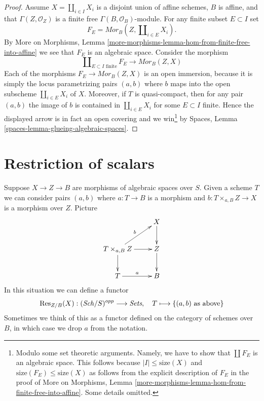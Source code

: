 \begin{proof}
\medskip\noindent
Assume $X = \coprod_{i \in I} X_i$ is a disjoint union of affine
schemes, $B$ is affine, and that $\Gamma(Z, \mathcal{O}_Z)$ is a finite
free $\Gamma(B, \mathcal{O}_B)$-module. For any finite subset
$E \subset I$ set
$$
F_E = \mathit{Mor}_B(Z, \coprod\nolimits_{i \in E} X_i).
$$
By More on Morphisms,
Lemma \ref{more-morphisms-lemma-hom-from-finite-free-into-affine}
we see that $F_E$ is an algebraic space. Consider the morphism
$$
\coprod\nolimits_{E \subset I\text{ finite}} F_E
\longrightarrow
\mathit{Mor}_B(Z, X)
$$
Each of the morphisms
$F_E \to \mathit{Mor}_B(Z, X)$ is an open immersion, because it is
simply the locus parametrizing pairs $(a, b)$ where $b$ maps into
the open subscheme $\coprod\nolimits_{i \in E} X_i$ of $X$. Moreover,
if $T$ is quasi-compact, then for any pair $(a, b)$ the image
of $b$ is contained in $\coprod\nolimits_{i \in E} X_i$ for some
$E \subset I$ finite. Hence the displayed arrow is in fact an
open covering and we win\footnote{Modulo
some set theoretic arguments. Namely, we have to show that
$\coprod F_E$ is an algebraic space. This follows because
$|I| \leq \text{size}(X)$ and $\text{size}(F_E) \leq \text{size}(X)$
as follows from the explicit description of $F_E$ in the proof of
More on Morphisms,
Lemma \ref{more-morphisms-lemma-hom-from-finite-free-into-affine}.
Some details omitted.} by
Spaces, Lemma \ref{spaces-lemma-glueing-algebraic-spaces}.
\end{proof}










\section{Restriction of scalars}
\label{section-restriction-of-scalars}

\noindent
Suppose $X \to Z \to B$ are morphisms of algebraic spaces over $S$.
Given a scheme $T$ we can consider pairs $(a, b)$ where $a : T \to B$
is a morphism and $b : T \times_{a, B} Z \to X$ is a morphism over $Z$.
Picture
\begin{equation}
\label{equation-pairs}
\vcenter{
\xymatrix{
& X \ar[d] \\
T \times_{a, B} Z \ar[d] \ar[ru]^b \ar[r] & Z \ar[d] \\
T \ar[r]^a & B
}
}
\end{equation}
In this situation we can define a
functor
\begin{equation}
\label{equation-restriction-of-scalars}
\text{Res}_{Z/B}(X) : (\mathit{Sch}/S)^{opp} \longrightarrow \textit{Sets},
\quad
T \longmapsto \{(a, b)\text{ as above}\}
\end{equation}
Sometimes we think of this as a functor defined on the category
of schemes over $B$, in which case we drop $a$ from the notation.

